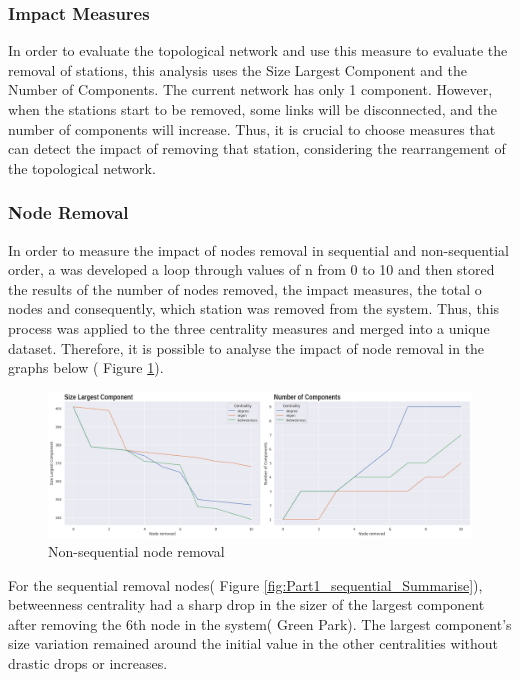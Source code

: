 \documentclass[10pt]{report}
\numberwithin{figure}{section}
\numberwithin{table}{section}
\begin{document}
\newpage    

\subsubsection{Impact Measures} 

In order to evaluate the topological network and use this measure to evaluate the removal of stations, this analysis uses the Size Largest Component and the Number of Components. The current network has only 1 component. However, when the stations start to be removed, some links will be disconnected, and the number of components will increase. Thus, it is crucial to choose measures that can detect the impact of removing that station, considering the rearrangement of the topological network. 

\subsubsection{Node Removal} 

In order to measure the impact of nodes removal in sequential and non-sequential order, a was developed a loop through values of n from 0 to 10 and then stored the results of the number of nodes removed, the impact measures, the total o nodes and consequently, which station was removed from the system. Thus, this process was applied to the three centrality measures and merged into a unique dataset. Therefore, it is possible to analyse the impact of node removal in the graphs below ( Figure \ref{fig:Part1_nonsequential_Summarise}). 


    \begin{figure}[htp]
        \centering
        \includegraphics[width=16cm]{Image/Part1_nonsequential_Summarise.png}
        \caption{Non-sequential node removal}
        \label{fig:Part1_nonsequential_Summarise}
    \end{figure}

For the sequential removal nodes( Figure \ref{fig:Part1_sequential_Summarise}),  betweenness centrality had a sharp drop in the sizer of the largest component after removing the 6th node in the system( Green Park). The largest component's size variation remained around the initial value in the other centralities without drastic drops or increases. 
\end{document}
